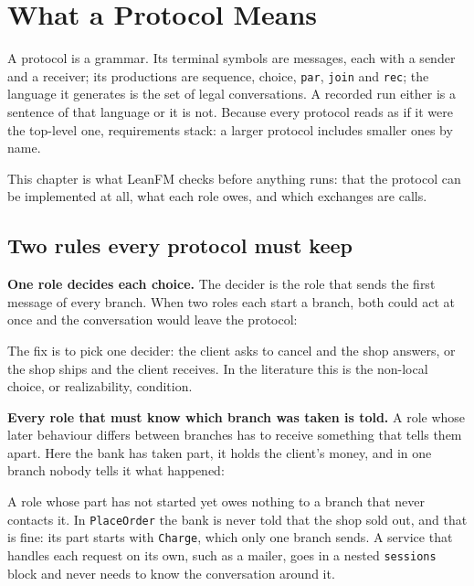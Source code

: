 \chapter{What a Protocol Means}
\label{ch:meaning}
\label{ch:grammar}

A protocol is a grammar. Its terminal symbols are messages, each with a sender
and a receiver; its productions are sequence, choice, \texttt{par},
\texttt{join} and \texttt{rec}; the language it generates is the set of legal
conversations. A recorded run either is a sentence of that language or it is not.
Because every protocol reads as if it were the top-level one, requirements stack:
a larger protocol includes smaller ones by name.

This chapter is what LeanFM checks before anything runs: that the protocol can
be implemented at all, what each role owes, and which exchanges are calls.

\section{Two rules every protocol must keep}

\textbf{One role decides each choice.} The decider is the role that sends the
first message of every branch. When two roles each start a branch, both could act
at once and the conversation would leave the protocol:





The fix is to pick one decider: the client asks to cancel and the shop answers,
or the shop ships and the client receives. In the literature this is the
non-local choice, or realizability, condition.

\textbf{Every role that must know which branch was taken is told.} A role whose
later behaviour differs between branches has to receive something that tells
them apart. Here the bank has taken part, it holds the client's money, and in one
branch nobody tells it what happened:





A role whose part has not started yet owes nothing to a branch that never
contacts it. In \texttt{PlaceOrder} the bank is never told that the shop sold
out, and that is fine: its part starts with \texttt{Charge}, which only one branch
sends. A service that handles each request on its own, such as a mailer, goes in
a nested \texttt{sessions} block and never needs to know the conversation around
it.

